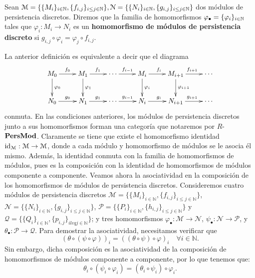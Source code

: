 \begin{definicion}
	Sean $\mathcal{M}= \{\{M_{i}\}_{i \in \mathbb{N}}, \{f_{i,j}\}_{i \leq j \in \mathbb{N}}\}, \mathcal{N}
	= \{\{N_{i}\}_{i \in \mathbb{N}}, \{g_{i,j}\}_{i \leq j \in \mathbb{N}}\}$ dos módulos de persistencia
	discretos. Diremos que la familia de homomorfismos
	$\varphi_{\bullet} = \{\varphi_{i}\}_{i \in \mathbb{N}}$ tales que
	$\varphi_{i} : M_{i} \to N_{i}$ es un \textbf{homomorfismo de módulos de
		persistencia discreto} si $g_{i,j}\circ \varphi_{i} = \varphi_{j} \circ f_{i,j}$.
\end{definicion}
La anterior definición es equivalente a decir que el diagrama
\[
\xymatrix{ M_0 \ar@{->}[r]^{f_0} \ar@{->}[d]^{\varphi_0} & M_1 \ar@{->}[r]^{f_1} \ar@{->}[d]^{\varphi_1} & \cdots \ar@{->}[r]^{f_{i-1}} & M_i \ar@{->}[r]^{f_i} \ar@{->}[d]^{\varphi_i} & M_{i+1} \ar@{->}[r]^{f_{i+1}} \ar@{->}[d]^{\varphi_{i+1}} & \cdots \\ N_0 \ar@{->}[r]^{g_0} & N_1 \ar@{->}[r]^{g_1} & \cdots \ar@{->}[r]^{g_{i-1}} & N_i \ar@{->}[r]^{g_i} & N_{i+1} \ar@{->}[r]^{g_{i+1}} & \cdots }
\]
conmuta. En las condiciones anteriores, los módulos de persistencia discretos
junto a sus homomorfismos forman una categoría que notaremos por $R$-$\mathbf{PersMod}$.
Claramente se tiene que existe el homomorfismo identidad $\operatorname{id}_{\mathcal{M}}: \mathcal{M}
\to \mathcal{M}$, donde a cada módulo y homomorfismo de módulos se le asocia él
mismo. Además, la identidad conmuta con la familia de homomorfismos de módulos, pues
es la composición con la identidad de homomorfismos de módulos componente a componente.
Veamos ahora la asociatividad en la composición de los homomorfismos de módulos
de persistencia discretos. Consideremos cuatro módulos de persistencia discretos
$\mathcal{M}= \{\{M_{i}\}_{i \in \mathbb{N}}, \{f_{i,j}\}_{i \leq j \in
	\mathbb{N}}\}$,
$\mathcal{N}= \{\{N_{i}\}_{i \in \mathbb{N}}, \{g_{i,j}\}_{i \leq j \in
	\mathbb{N}}\}$, $\mathcal{P}= \{\{P_{i}\}_{i \in \mathbb{N}}, \{h_{i,j}\}_{i
	\leq j \in \mathbb{N}}\}$ y $\mathcal{Q}= \{\{Q_{i}\}_{i \in \mathbb{N}}, \{p_{i,j}
\}_{i leq j \in \mathbb{N}}\}$; y tres homomorfismos
$\varphi_{\bullet} : \mathcal{M}\to \mathcal{N}$, $\psi_{\bullet} : \mathcal{N}\to
\mathcal{P}$, y $\theta_{\bullet} : \mathcal{P}\to \mathcal{Q}$. Para demostrar la
asociatividad, necesitamos verificar que
\[
(\theta \circ (\psi \circ \varphi))_{i} = ((\theta \circ \psi) \circ \varphi)_{i}
\quad \forall i \in \mathbb{N}.
\]
Sin embargo, dicha composición es la asociatividad de la composición de homomorfismos
de módulos componente a componente, por lo que tenemos que:
\[
\theta_{i} \circ (\psi_{i} \circ \varphi_{i}) = (\theta_{i} \circ \psi_{i}) \circ
\varphi_{i}.
\]

